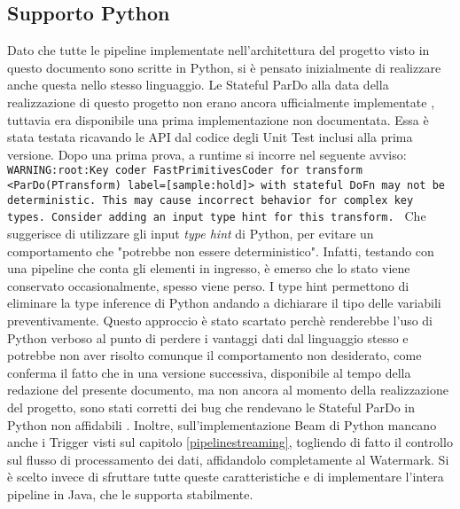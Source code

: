 \subsection{Supporto Python}
Dato che tutte le pipeline implementate nell'architettura del progetto visto in questo documento sono scritte in Python, si è pensato inizialmente di realizzare anche questa nello stesso linguaggio. Le Stateful ParDo alla data della realizzazione di questo progetto non erano ancora ufficialmente implementate \cite{beam2687}, tuttavia era disponibile una prima implementazione non documentata\cite{beam4594}. Essa è stata testata ricavando le API dal codice degli Unit Test inclusi alla prima versione. Dopo una prima prova, a runtime si incorre nel seguente avviso:\newline\newline
\texttt{\allowdisplaybreaks
WARNING:root:Key coder FastPrimitivesCoder for transform
 <ParDo(PTransform) label=[sample:hold]> with stateful DoFn
may not be deterministic. This may cause incorrect behavior
 for complex key types. Consider adding an input type hint 
 for this transform.
}\newline\newline
Che suggerisce di utilizzare gli input \textit{type hint} di Python, per evitare un comportamento che "potrebbe non essere deterministico". Infatti, testando con una pipeline che conta gli elementi in ingresso, è emerso che lo stato viene conservato occasionalmente, spesso viene perso. I type hint permettono di eliminare la type inference di Python \cite{shannon_mark_2014} andando a dichiarare il tipo delle variabili preventivamente. Questo approccio è stato scartato perchè renderebbe l'uso di Python verboso al punto di perdere i vantaggi dati dal linguaggio stesso e potrebbe non aver risolto comunque il comportamento non desiderato, come conferma il fatto che in una versione successiva, disponibile al tempo della redazione del presente documento, ma non ancora al momento della realizzazione del progetto, sono stati corretti dei bug che rendevano le Stateful ParDo in Python non affidabili \cite{beam7035}. Inoltre, sull'implementazione Beam di Python mancano anche i Trigger visti sul capitolo \ref{pipelinestreaming}, togliendo di fatto il controllo sul flusso di processamento dei dati, affidandolo completamente al Watermark. Si è scelto invece di sfruttare tutte queste caratteristiche e di implementare l'intera pipeline in Java, che le supporta stabilmente.
